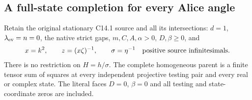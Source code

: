 \subsection{A full-state completion for every Alice angle}
\label{sec:c1-c141-all-alice}

\begin{theorem}\label{thm:c1-c141-all-tests}
Retain the original stationary C14.1 source and all its intersections:
$d=1$, $\lambda_{\rm ev}=n=0$, the native strict gaps,
$m,C,A,\alpha>0$, $D,\beta\ge0$, and
\[
 x=k^2,\qquad z=(x\zeta)^{-1},\qquad\sigma=\eta^{-1}
          \quad\hbox{positive source infinitesimals}.
\]
There is no restriction on $H=h/\sigma$. The complete homogeneous
parent is a finite tensor sum of squares at every independent
projective testing pair and every real or complex state. The literal
faces $D=0$, $\beta=0$ and all testing and state-coordinate zeros
are included.
\end{theorem}

